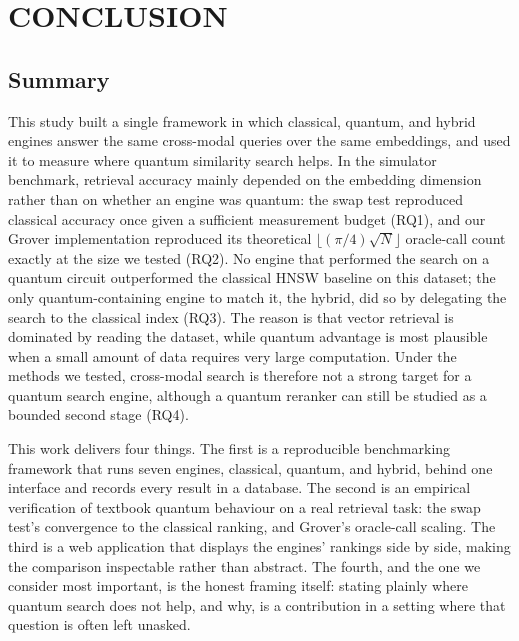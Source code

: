 \chapter{CONCLUSION}
\label{ch:conclusion}


\section{Summary}
\label{sec:conclusion:summary}

This study built a single framework in which classical, quantum, and hybrid
engines answer the same cross-modal queries over the same embeddings, and used it
to measure where quantum similarity search helps. In the simulator benchmark,
retrieval accuracy mainly depended on the embedding dimension rather than on
whether an engine was quantum: the swap test reproduced classical accuracy once
given a sufficient measurement budget (RQ1), and our Grover implementation
reproduced its theoretical $\lfloor (\pi/4)\sqrt{N} \rfloor$ oracle-call count
exactly at the size we tested (RQ2). No engine that performed the search on a
quantum circuit outperformed the classical HNSW baseline on this dataset; the
only quantum-containing engine to match it, the hybrid, did so by delegating the
search to the classical index (RQ3). The reason is that vector retrieval is
dominated by reading the dataset, while quantum advantage is most plausible when
a small amount of data requires very large computation. Under the methods we
tested, cross-modal search is therefore not a strong target for a quantum search
engine, although a quantum reranker can still be studied as a bounded second
stage (RQ4).

This work delivers four things. The first is a reproducible benchmarking framework
that runs seven engines, classical, quantum, and hybrid, behind one interface and
records every result in a database. The second is an empirical verification of
textbook quantum behaviour on a real retrieval task: the swap test's convergence
to the classical ranking, and Grover's oracle-call scaling. The third is a web
application that displays the engines' rankings side by side, making the
comparison inspectable rather than abstract. The fourth, and the one we consider
most important, is the honest framing itself: stating plainly where quantum search
does not help, and why, is a contribution in a setting where that question is
often left unasked.


